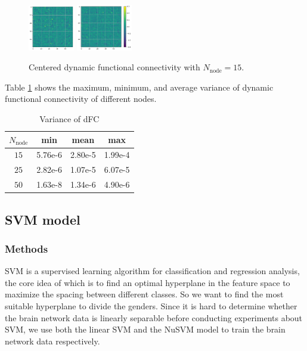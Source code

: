 \documentclass[11pt]{article}
\begin{document}
\begin{figure}[H]
{        \includegraphics[width=0.18\textwidth]{../Analysis/DFC/size=480_step=180_rho=0.1/node=50_id=100206/n_c_18.jpg}
        \includegraphics[width=0.2175\textwidth]{../Analysis/DFC/size=480_step=180_rho=0.1/node=50_id=100206/c_24.jpg}}
    \caption{Centered dynamic functional connectivity with $N_{\text{node}} = 15$.}
    \label{sample-dfc-c}
\end{figure}

Table \ref{var-dfc} shows the maximum, minimum, and average variance of dynamic functional connectivity of different nodes.

\begin{table}[H]
    \centering
    \begin{tabular}{|c|c|c|c|}
        \hline
        $N_{\text{node}}$ & min     & mean    & max     \\
        \hline
        $15$              & 5.76e-6 & 2.80e-5 & 1.99e-4 \\
        \hline
        $25$              & 2.82e-6 & 1.07e-5 & 6.07e-5 \\
        \hline
        $50$              & 1.63e-8 & 1.34e-6 & 4.90e-6 \\
        \hline
    \end{tabular}
    \caption{Variance of dFC}
    \label{var-dfc}
\end{table}

\subsection{SVM model}

\subsubsection{Methods}

SVM is a supervised learning algorithm for classification and regression analysis, the core idea of which is to find an optimal hyperplane in the feature space to maximize the spacing between different classes. So we want to find the most suitable hyperplane to divide the genders.
Since it is hard to determine whether the brain network data is linearly separable before conducting experiments about SVM, we use both the linear SVM and the NuSVM model to train the brain network data respectively.
\end{document}
